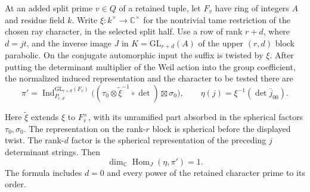 \begin{auxlemma}\label{lem:new-ray-character-line}
At an added split prime \(v\in Q\) of a retained tuple, let
\(F_v\) have ring of integers \(A\) and residue field \(k\).
Write \(\xi:k^\times\to\mathbb C^\times\) for the nontrivial tame
restriction of the chosen ray character, in the selected split half.
Use a row of rank \(r+d\), where \(d=jt\), and the inverse image \(J\)
in \(K=\mathrm{GL}_{r+d}(A)\) of the upper \((r,d)\) block parabolic.
On the conjugate automorphic input the suffix is twisted by \(\xi\).
After putting the determinant multiplier of the Weil action into the
group coefficient, the normalized induced representation and the
character to be tested there are
\[
 \pi'=\operatorname{Ind}_{P_{r,d}}^{\mathrm{GL}_{r+d}(F_v)}
       \big((\tau_0\otimes\widetilde\xi^{-1}\circ\det)
                           \boxtimes\sigma_0\big),
 \qquad \eta(j)=\xi^{-1}(\det\bar j_{00}).
\]

Here \(\widetilde\xi\) extends \(\xi\) to \(F_v^\times\), with its
unramified part absorbed in the spherical factors \(\tau_0,\sigma_0\).
The representation on the rank-\(r\) block is spherical before the
displayed twist. The rank-\(d\) factor is the spherical representation
of the preceding \(j\) determinant strings. Then
\[
               \dim_{\mathbb C}\operatorname{Hom}_{J}(\eta,\pi')=1.
\]
The formula includes \(d=0\) and every power of the retained character
prime to its order.
\end{auxlemma}

